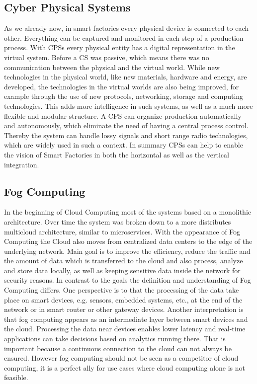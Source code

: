 \subsection{Cyber Physical Systems}
As we already now, in smart factories every physical device is connected to each other.
Everything can be captured and monitored in each step of a production process.
With \acp{CPS} every physical entity has a digital representation in the virtual system.\cite[cf.][p. 1363]{Poovendran:2010}
Before a \ac{CS} was passive, which means there was no communication between the physical and the virtual world.\cite[cf.][p. 1364]{Poovendran:2010}
While new technologies in the physical world, like new materials, hardware and energy, are developed, the technologies in the virtual worlds are also being improved, for example through the use of new protocols, networking, storage and computing technologies.\cite[cf.][p. 1364]{Poovendran:2010}
This adds more intelligence in such systems, as well as a much more flexible and modular structure.
A \ac{CPS} can organize production automatically and autonomously, which eliminate the need of having a central process control.\cite[cf.]{Lom:2016}
Thereby the system can handle lossy signals and short range radio technologies, which are widely used in such a context.\cite[cf.]{Yannuzzi2014}
In summary \acp{CPS} can help to enable the vision of Smart Factories in both the horizontal as well as the vertical integration.


\subsection{Fog Computing}
In the beginning of Cloud Computing most of the systems based on a monolithic architecture.
Over time the system was broken down to a more distributes multicloud architecture, similar to microservices.
With the appearance of Fog Computing the Cloud also moves from centralized data centers to the edge of the underlying network.
Main goal is to improve the efficiency, reduce the traffic and the amount of data which is transferred to the cloud and also process, analyze and store data locally, as well as keeping sensitive data inside the network for security reasons.\cite[cf.][p. 236]{Brito2016}\cite[cf.][p. 325]{Yannuzzi2014}\cite[cf.][p. 4]{Lom:2016}
In contrast to the goals the definition and understanding of Fog Computing differs.
One perspective is to that the processing of the data take place on smart devices, e.g. sensors, embedded systems, etc., at the end of the network or in smart router or other gateway devices.\cite[cf.][p. 4]{Lom:2016}
Another interpretation is that fog computing appears as an intermediate layer between smart devices and the cloud.\cite[cf.][p. 236]{Brito2016}
Processing the data near devices enables lower latency and real-time applications can take decisions based on analytics running there.
That is important because a continuous connection to the cloud can not always be ensured.
However fog computing should not be seen as a competitor of cloud computing, it is a perfect ally for use cases where cloud computing alone is not feasible.\cite[cf.][p. 325]{Yannuzzi2014}



